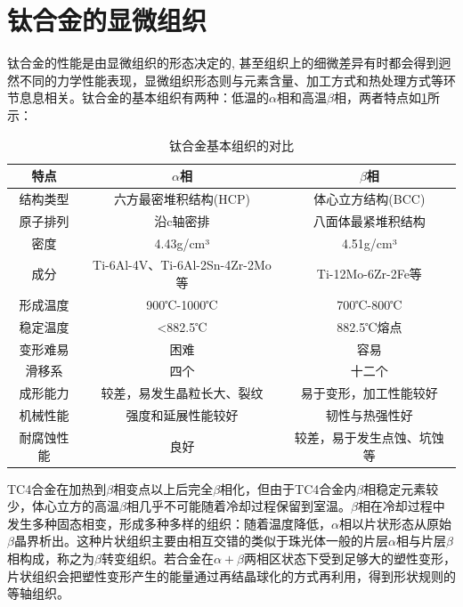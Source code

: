 \section{钛合金的显微组织}
钛合金的性能是由显微组织的形态决定的, 甚至组织上的细微差异有时都会得到迥然不同的力学性能表现，显微组织形态则与元素含量、加工方式和热处理方式等环节息息相关。钛合金的基本组织有两种：低温的$\alpha$相和高温$\beta$相，两者特点如\ref{sec:alphaandbeta}所示：

\begin{table}[htbp]
	\centering
	\caption{钛合金基本组织的对比}
	\label{sec:alphaandbeta}
	\begin{tabular}{ccc}
		\toprule
		 特点&$ \alpha $相&$ \beta $相\\ \midrule
		 结构类型 & 六方最密堆积结构(HCP) & 体心立方结构(BCC) \\
		 原子排列 & 沿c轴密排 & 八面体最紧堆积结构\\
		 密度 & 4.43g/cm³ & 4.51g/cm³ \\
		 成分 & Ti-6Al-4V、Ti-6Al-2Sn-4Zr-2Mo等 & Ti-12Mo-6Zr-2Fe等 \\
		 形成温度 & 900℃-1000℃ & 700℃-800℃ \\
 		 稳定温度 & <882.5℃ & 882.5℃熔点 \\
 		 变形难易 & 困难 & 容易 \\
 		 滑移系 & 四个 & 十二个 \\
		 成形能力 & 较差，易发生晶粒长大、裂纹 & 易于变形，加工性能较好 \\
		 机械性能 & 强度和延展性能较好 & 韧性与热强性好 \\
		 耐腐蚀性能 & 良好 & 较差，易于发生点蚀、坑蚀等 \\
		\bottomrule
	\end{tabular}
\end{table}

TC4合金在加热到$ \beta $相变点以上后完全$ \beta $相化，但由于TC4合金内$ \beta $相稳定元素较少，体心立方的高温$\beta$相几乎不可能随着冷却过程保留到室温。$\beta$相在冷却过程中发生多种固态相变，形成多种多样的组织：随着温度降低，$\alpha$相以片状形态从原始$\beta$晶界析出。这种片状组织主要由相互交错的类似于珠光体一般的片层$\alpha$相与片层$\beta$相构成，称之为$\beta$转变组织。若合金在$\alpha+\beta$两相区状态下受到足够大的塑性变形，片状组织会把塑性变形产生的能量通过再结晶球化的方式再利用，得到形状规则的等轴组织。


